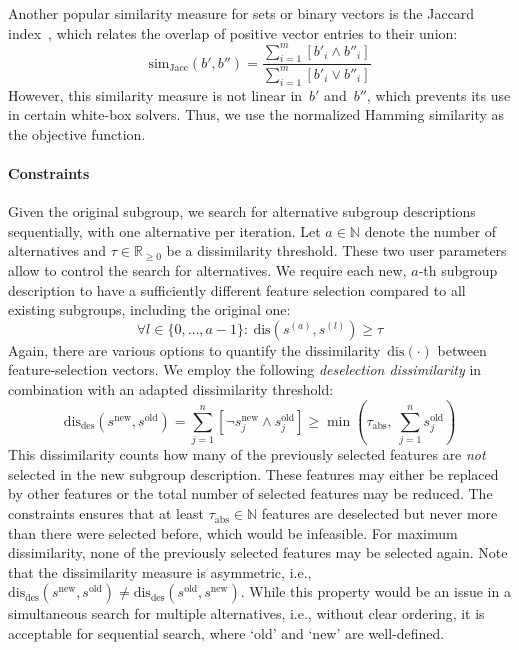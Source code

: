\documentclass{article}
\theoremstyle{definition}
\begin{document}
Another popular similarity measure for sets or binary vectors is the Jaccard index~\cite{choi2010survey}, which relates the overlap of positive vector entries to their union:
%
\begin{equation}
	\text{sim}_{\text{Jacc}}(b', b'') = \frac{\sum_{i=1}^{m} [b'_i \land b''_i ]}{\sum_{i=1}^{m} [b'_i \lor b''_i]}
	\label{eq:csd:jaccard}
\end{equation}
%
However, this similarity measure is not linear in~$b'$ and~$b''$, which prevents its use in certain white-box solvers.
Thus, we use the normalized Hamming similarity as the objective function.

\paragraph{Constraints}

Given the original subgroup, we search for alternative subgroup descriptions sequentially, with one alternative per iteration.
Let $a \in \mathbb{N}$ denote the number of alternatives and $\tau \in \mathbb{R}_{\geq 0}$ be a dissimilarity threshold.
These two user parameters allow to control the search for alternatives.
We require each new, $a$-th subgroup description to have a sufficiently different feature selection compared to all {existing subgroups}, including the original one:
%
\begin{equation}
	\forall l \in \{0, \dots, a-1\}:~ \text{dis}(s^{(a)}, s^{(l)}) \geq \tau
	\label{eq:csd:constraint-dissimilarity-general}
\end{equation}
%
Again, there are various options to quantify the dissimilarity~$\text{dis}(\cdot)$ between feature-selection vectors.
We employ the following \emph{deselection dissimilarity} in combination with an adapted dissimilarity threshold:
%
\begin{equation}
	\text{dis}_{\text{des}}(s^{\text{new}}, s^{\text{old}}) = \sum_{j=1}^n [\lnot s^{\text{new}}_j \land s^{\text{old}}_j] \geq \min \left( \tau_{\text{abs}},~\sum_{j=1}^n s^{\text{old}}_j \right)
	\label{eq:csd:constraint-dissimilarity-special}
\end{equation}
%
This dissimilarity counts how many of the previously selected features are \emph{not} selected in the new subgroup description.
These features may either be replaced by other features or the total number of selected features may be reduced.
The constraints ensures that at least $\tau_{\text{abs}} \in \mathbb{N}$ features are deselected but never more than there were selected before, which would be infeasible.
For maximum dissimilarity, none of the previously selected features may be selected again.
Note that the dissimilarity measure is asymmetric, i.e., $\text{dis}_{\text{des}}(s^{\text{new}}, s^{\text{old}}) \neq \text{dis}_{\text{des}}(s^{\text{old}}, s^{\text{new}})$.
While this property would be an issue in a simultaneous search for multiple alternatives, i.e., without clear ordering, it is acceptable for sequential search, where `old' and `new' are well-defined.
\end{document}
